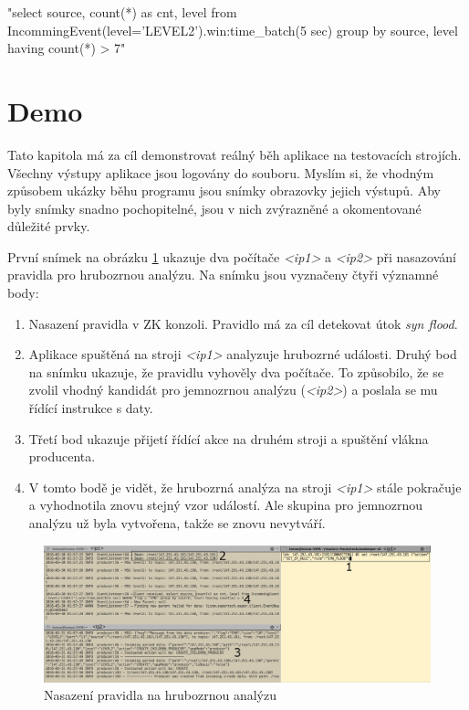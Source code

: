 \documentclass[
  digital, %
  table,   %
  nolof,     %
  nolot,     %
  oneside, %
  nocover,
  monochrome,
  12pt
]{fithesis3}
\begin{document}
\begin{center}
\begin{minipage}[H]{\linewidth}
	\begin{mylisting}
"select source, count(*) as cnt, level from
IncommingEvent(level='LEVEL2').win:time_batch(5 sec) group
by source, level having count(*) > 7"
	\end{mylisting}
	\label{fig:level_2_rule} 
\end{minipage}
\end{center}

\section{Demo}
Tato kapitola má za cíl demonstrovat reálný běh aplikace na testovacích strojích. Všechny výstupy aplikace jsou logovány do souboru. Myslím si, že vhodným způsobem ukázky běhu programu jsou snímky obrazovky jejich výstupů. Aby byly snímky snadno pochopitelné, jsou v nich zvýrazněné a okomentované důležité prvky.

První snímek na obrázku \ref{fig:deploy-rule-screen} ukazuje dva počítače \textit{<ip1>} a \textit{<ip2>} při nasazování pravidla pro hrubozrnou analýzu. Na snímku jsou vyznačeny čtyři významné body:

\begin{enumerate}
  \item Nasazení pravidla v ZK konzoli. Pravidlo má za cíl detekovat útok \textit{syn flood}.
  \item Aplikace spuštěná na stroji \textit{<ip1>} analyzuje hrubozrné události. Druhý bod na snímku ukazuje, že pravidlu vyhověly dva počítače. To způsobilo, že se zvolil vhodný kandidát pro jemnozrnou analýzu (\textit{<ip2>}) a poslala se mu řídící instrukce s daty.
  \item Třetí bod ukazuje přijetí řídící akce na druhém stroji a spuštění vlákna producenta. 
  \item V tomto bodě je vidět, že hrubozrná analýza na stroji \textit{<ip1>} stále pokračuje a vyhodnotila znovu stejný vzor událostí. Ale skupina pro jemnozrnou analýzu už byla vytvořena, takže se znovu nevytváří.
\end{enumerate}

\begin{figure}[H]
	\centering
    \includegraphics[width=\linewidth, height=.3\textheight]{images/deploy-rule-screen.png}
    \caption{Nasazení pravidla na hrubozrnou analýzu}
    \label{fig:deploy-rule-screen}
\end{figure}
\end{document}
